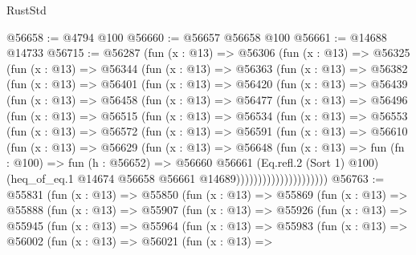 \begin{lexlean}{RustStd}
\begin{coremodule}
@56658 := @4794 @100
@56660 := @56657 @56658 @100
@56661 := @14688 @14733
@56715 := @56287
    (fun (x : @13) =>
    @56306
      (fun (x : @13) =>
      @56325
        (fun (x : @13) =>
        @56344
          (fun (x : @13) =>
          @56363
            (fun (x : @13) =>
            @56382
              (fun (x : @13) =>
              @56401
                (fun (x : @13) =>
                @56420
                  (fun (x : @13) =>
                  @56439
                    (fun (x : @13) =>
                    @56458
                      (fun (x : @13) =>
                      @56477
                        (fun (x : @13) =>
                        @56496
                          (fun (x : @13) =>
                          @56515
                            (fun (x : @13) =>
                            @56534
                              (fun (x : @13) =>
                              @56553
                                (fun (x : @13) =>
                                @56572
                                  (fun (x : @13) =>
                                  @56591
                                    (fun (x : @13) =>
                                    @56610
                                      (fun (x : @13) =>
                                      @56629
                                        (fun (x : @13) =>
                                        @56648
                                          (fun (x : @13) =>
                                          fun (fn : @100) =>
                                          fun (h : @56652) =>
                                          @56660
                                            @56661
                                            (Eq.refl.{2} (Sort 1) @100)
                                            (heq_of_eq.{1}
                                              @14674
                                              @56658
                                              @56661
                                              @14689)))))))))))))))))))))
@56763 := @55831
    (fun (x : @13) =>
    @55850
      (fun (x : @13) =>
      @55869
        (fun (x : @13) =>
        @55888
          (fun (x : @13) =>
          @55907
            (fun (x : @13) =>
            @55926
              (fun (x : @13) =>
              @55945
                (fun (x : @13) =>
                @55964
                  (fun (x : @13) =>
                  @55983
                    (fun (x : @13) =>
                    @56002
                      (fun (x : @13) =>
                      @56021
                        (fun (x : @13) =>

\end{coremodule}
\end{lexlean}
